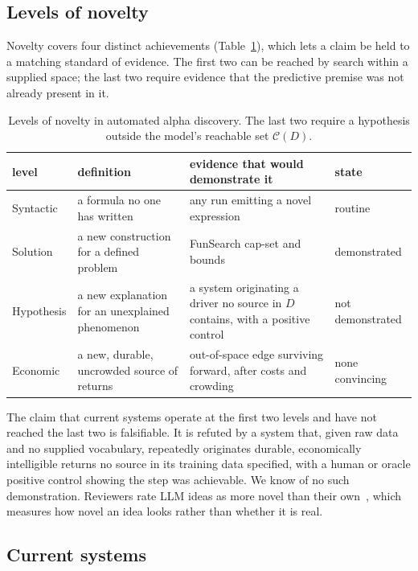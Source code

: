 \documentclass[11pt]{article}
\begin{document}
\subsection{Levels of novelty}
\label{sec:novelty}

Novelty covers four distinct achievements (Table~\ref{tab:novelty}), which lets a claim be held to a
matching standard of evidence. The first two can be reached by search within a supplied space; the
last two require evidence that the predictive premise was not already present in it.

\begin{table}[htbp]
\centering
\caption{Levels of novelty in automated alpha discovery. The last two require a hypothesis outside
the model's reachable set $\mathcal{C}(D)$.}
\label{tab:novelty}
\small
\begin{tabular}{@{}p{2.3cm} p{3.9cm} p{4.1cm} p{2.4cm}@{}}
\toprule
level & definition & evidence that would demonstrate it & state \\
\midrule
Syntactic & a formula no one has written & any run emitting a novel expression & routine \\[2pt]
Solution & a new construction for a defined problem & FunSearch cap-set and bounds~\cite{funsearch} & demonstrated \\[2pt]
Hypothesis & a new explanation for an unexplained phenomenon & a system originating a driver no source in $D$ contains, with a positive control & not demonstrated \\[2pt]
Economic & a new, durable, uncrowded source of returns & out-of-space edge surviving forward, after costs and crowding & none convincing \\
\bottomrule
\end{tabular}
\end{table}

The claim that current systems operate at the first two levels and have not reached the last two is
falsifiable. It is refuted by a system that, given raw data and no supplied vocabulary, repeatedly
originates durable, economically intelligible returns no source in its training data specified, with
a human or oracle positive control showing the step was achievable. We know of no such demonstration.
Reviewers rate LLM ideas as more novel than their own~\cite{si2024}, which measures how novel an idea
looks rather than whether it is real.

\subsection{Current systems}
\label{sec:audit}
\end{document}
